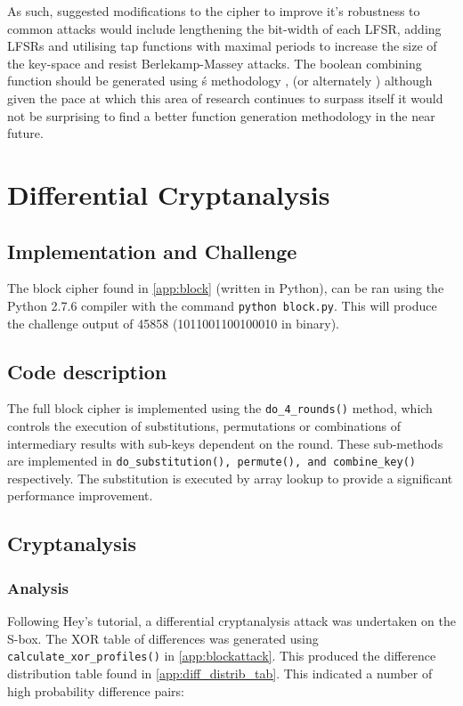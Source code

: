 \documentclass[british,10pt,a4paper]{article}
\begin{document}
As such, suggested modifications to the cipher to improve it's robustness to common attacks would include lengthening the bit-width of each LFSR, adding LFSRs and utilising tap functions with maximal periods to increase the size of the key-space and resist Berlekamp-Massey attacks. The boolean combining function should be generated using \citeauthor{carlet2}\'s methodology \cite{carlet2}, (or alternately \citet{tang}) although given the pace at which this area of research continues to surpass itself it would not be surprising to find a better function generation methodology in the near future.

\clearpage
\section{Differential Cryptanalysis}
\subsection{Implementation and Challenge}
The block cipher found in \autoref{app:block} (written in Python),{}
can be ran using the Python 2.7.6 compiler with the command \lstinline{python block.py}. This will produce the
challenge output of 45858 (1011001100100010 in binary).
\subsection{Code description}
The full block cipher is implemented using the \lstinline{do_4_rounds()} method, which controls the execution of substitutions, permutations or combinations
of intermediary results with sub-keys dependent on the round. These sub-methods are implemented in \lstinline{do_substitution(), permute(), and combine_key()} respectively. The substitution is executed by array lookup to provide a significant performance improvement.

\subsection{Cryptanalysis}
\subsubsection{Analysis}
Following Hey's tutorial, a differential cryptanalysis attack was undertaken on
the S-box. The XOR table of differences was generated using \lstinline{calculate_xor_profiles()} in \autoref{app:blockattack}. This produced the difference distribution table found in \autoref{app:diff_distrib_tab}.
This indicated a number of high probability difference pairs:
\end{document}
